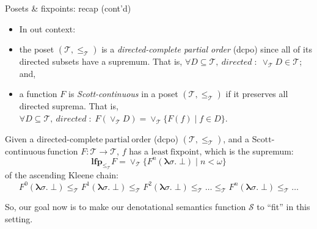 \documentclass[aspectratio=169]{beamer}
\begin{document}
%
\begin{frame}{Posets \& fixpoints: recap (cont'd)}
  \vspace*{-1em}
  \begin{itemize}
  \item In out context:
  \item the poset $(\mathcal{T},\leq_{\mathcal{T}})$ is a
    \emph{directed-complete partial order} (dcpo) since all of its
    directed subsets have a supremum.
    That is,
    $\forall D \subseteq
    \mathcal{T},~directed\;\pmb{:}\;\vee_{\mathcal{T}}D \in
    \mathcal{T}$; and,
  \pause\item a function $F$ is \emph{Scott-continuous} in a poset
    $(\mathcal{T},\leq_{\mathcal{T}})$ if it preserves all directed
    suprema.
    That is,
    $\forall D \subseteq \mathcal{T},~directed\;\pmb{:}\;F(\vee_{\mathcal{T}}D)
    = \vee_{\mathcal{T}}\{F(f)\;\pmb{|}\;f \in D\}.$
  \end{itemize}
  \pause\begin{theorem}
    Given a $\mathrm{directed}$-$\mathrm{complete~partial~order}$
    (dcpo) $(\mathcal{T},\leq_{\mathcal{T}})$, and a
    $\mathrm{Scott}$-$\mathrm{continuous~function}$
    $F : \mathcal{T} \to \mathcal{T}$, $f$ has a
    $\mathrm{least~fixpoint}$, which is the supremum:
    \[
      \pmb{lfp}_{\leq_{\mathcal{T}}} F = \vee_{\mathcal{T}} \{F^n(\pmb{\lambda}\sigma\pmb{.}\;\bot)\;\pmb{|}\;n < \omega\}
    \]
    of the ascending
    Kleene chain:
    \[
      F^0(\pmb{\lambda}\sigma\pmb{.}\;\bot) \leq_{\mathcal{T}}
      F^1(\pmb{\lambda}\sigma\pmb{.}\;\bot) \leq_{\mathcal{T}}
      F^2(\pmb{\lambda}\sigma\pmb{.}\;\bot) \leq_{\mathcal{T}}
      \ldots \leq_{\mathcal{T}}
      F^n(\pmb{\lambda}\sigma\pmb{.}\;\bot) \leq_{\mathcal{T}}
      \ldots
    \]
  \end{theorem}
  \pause So, our goal now is to make our denotational semantics function
  $\pmb{\mathscr{S}}$ to ``fit'' in this setting.
\end{frame}
%
\end{document}
